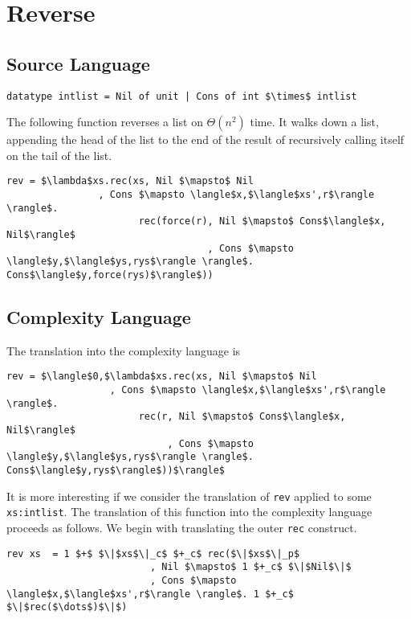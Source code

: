 \section{Reverse}

\subsection*{Source Language}

\begin{lstlisting}
datatype intlist = Nil of unit | Cons of int $\times$ intlist
\end{lstlisting}
The following function reverses a list on $\Theta(n^2)$ time.
It walks down a list, appending the head of the list to the end of the result of recursively calling itself on the tail of the list.
\begin{lstlisting}[frame=single]
rev = $\lambda$xs.rec(xs, Nil $\mapsto$ Nil
                , Cons $\mapsto \langle$x,$\langle$xs',r$\rangle \rangle$.
                       rec(force(r), Nil $\mapsto$ Cons$\langle$x, Nil$\rangle$
                                   , Cons $\mapsto \langle$y,$\langle$ys,rys$\rangle \rangle$. Cons$\langle$y,force(rys)$\rangle$))
\end{lstlisting}


\subsection*{Complexity Language}
The translation into the complexity language is
\begin{lstlisting}
rev = $\langle$0,$\lambda$xs.rec(xs, Nil $\mapsto$ Nil
                  , Cons $\mapsto \langle$x,$\langle$xs',r$\rangle \rangle$.
                       rec(r, Nil $\mapsto$ Cons$\langle$x, Nil$\rangle$
                            , Cons $\mapsto \langle$y,$\langle$ys,rys$\rangle \rangle$. Cons$\langle$y,rys$\rangle$))$\rangle$
\end{lstlisting}

It is more interesting if we consider the translation of \texttt{rev} applied to some \texttt{xs:intlist}.
The translation of this function into the complexity language proceeds as follows.
We begin with translating the  outer \texttt{rec} construct.

\begin{lstlisting}
rev xs  = 1 $+$ $\|$xs$\|_c$ $+_c$ rec($\|$xs$\|_p$
                         , Nil $\mapsto$ 1 $+_c$ $\|$Nil$\|$
                         , Cons $\mapsto \langle$x,$\langle$xs',r$\rangle \rangle$. 1 $+_c$ $\|$rec($\dots$)$\|$)
\end{lstlisting}


